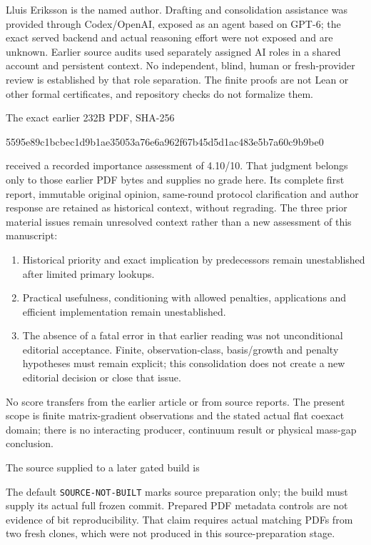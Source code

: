 Lluis Eriksson is the named author. Drafting and consolidation assistance was
provided through Codex/OpenAI, exposed as an agent based on GPT-6; the exact
served backend and actual reasoning effort were not exposed and are unknown.
Earlier source audits used separately assigned AI roles in a shared account
and persistent context. No independent, blind, human or fresh-provider review
is established by that role separation. The finite proofs are not Lean or
other formal certificates, and repository checks do not formalize them.

The exact earlier 232B PDF, SHA-256
\begin{center}\small\ttfamily
5595e89c1bcbec1d9b1ae35053a76e6a962f67b45d5d1ac483e5b7a60c9b9be0
\end{center}
received a recorded importance assessment of 4.10/10. That judgment belongs
only to those earlier PDF bytes and supplies no grade here. Its complete
first report, immutable original opinion, same-round protocol clarification
and author response are retained as historical context, without regrading.
The three prior material issues remain unresolved context rather than a new
assessment of this manuscript:
\begin{enumerate}[leftmargin=*]
\item Historical priority and exact implication by predecessors remain
unestablished after limited primary lookups.
\item Practical usefulness, conditioning with allowed penalties, applications
and efficient implementation remain unestablished.
\item The absence of a fatal error in that earlier reading was not
unconditional editorial acceptance. Finite, observation-class, basis/growth
and penalty hypotheses must remain explicit; this consolidation does not
create a new editorial decision or close that issue.
\end{enumerate}
No score transfers from the earlier article or from source reports. The
present scope is finite matrix-gradient observations and the stated actual
flat coexact domain; there is no interacting producer, continuum result or
physical mass-gap conclusion.

The source supplied to a later gated build is
\begin{center}\small\ttfamily\SourceCommit\end{center}
The default \texttt{SOURCE-NOT-BUILT} marks source
preparation only; the build must supply its actual full frozen commit.
Prepared PDF metadata controls are not evidence of bit reproducibility.
That claim requires actual matching PDFs from two fresh clones, which were
not produced in this source-preparation stage.

